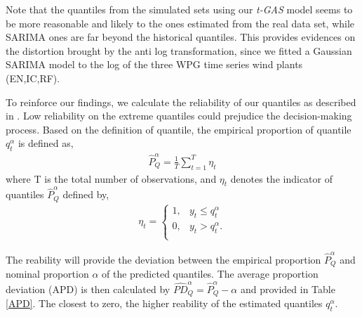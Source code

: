 \documentclass[a4paper]{IEEEtran}
\begin{document}
Note that the quantiles from the simulated sets using our \emph{t-GAS} model seems to be more reasonable and likely to the ones estimated from the real data set, while SARIMA ones are far beyond the historical quantiles. This provides evidences on the distortion brought by the anti log transformation, since we fitted a Gaussian SARIMA model to the log of the three WPG time series wind plants (EN,IC,RF).

To reinforce our findings, we calculate the reliability of our quantiles as described in \cite{Wan2017}. Low reliability on the extreme quantiles could prejudice the decision-making process. Based on the definition of quantile, the empirical proportion of quantile $q_t^\alpha$ is defined as,
\begin{align} 
\hat{P}_Q^\alpha = \frac{1}{T}\sum_{t=1}^T \eta_t
\end{align}
\noindent
where T is the total number of observations, and $\eta_t$ denotes the indicator of quantiles $\hat{P}_Q^\alpha$ defined by,
\begin{align} 
\eta_t=
\begin{cases}
1, & y_t \leq q_t^\alpha\\
0, & y_t > q_t^\alpha.\\
\end{cases}
\end{align}

The reability will provide the deviation between the empirical proportion $\hat{P}_Q^\alpha$ and nominal proportion $\alpha$ of the predicted quantiles. The average proportion deviation (APD) is then calculated by $\hat{PD}_Q^\alpha = \hat{P}_Q^\alpha - \alpha$ and provided in Table \ref{APD}. The closest to zero, the higher reability of the estimated quantiles $q_t^\alpha$.
\end{document}
